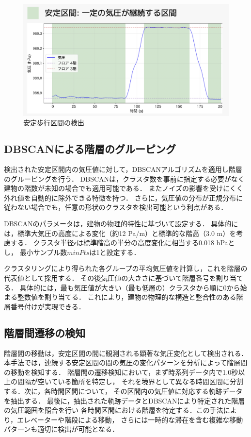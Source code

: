 \begin{figure}[h]
	\centering
	\includegraphics[width=\linewidth]{image/stable.jpg}
	\caption{安定歩行区間の検出}    \label{fig:stable_section}
\end{figure}

\subsection{DBSCANによる階層のグルーピング}
検出された安定区間内の気圧値に対して，DBSCANアルゴリズムを適用し階層のグルーピングを行う．
DBSCANは，クラスタ数を事前に指定する必要がなく建物の階数が未知の場合でも適用可能である．
またノイズの影響を受けにくく外れ値を自動的に除外できる特徴を持つ．
さらに，気圧値の分布が正規分布に従わない場合でも，任意の形状のクラスタを検出可能という利点がある．

DBSCANのパラメータは，建物の物理的特性に基づいて設定する．
具体的には，標準大気圧の高度による変化（約12 Pa/m）と標準的な階高（3.0 m）を考慮する．
クラスタ半径$\epsilon$は標準階高の半分の高度変化に相当する0.018 hPaとし，
最小サンプル数$minPts$は1と設定する．

クラスタリングにより得られた各グループの平均気圧値を計算し，これを階層の代表値として採用する．
その後気圧値の大きさに基づいて階層番号を割り当てる．
具体的には，最も気圧値が大きい（最も低層の）クラスタから順に0から始まる整数値を割り当てる．
これにより，建物の物理的な構造と整合性のある階層番号付けが実現できる．

\subsection{階層間遷移の検知}
階層間の移動は，安定区間の間に観測される顕著な気圧変化として検出される．
本手法では，連続する安定区間の間の気圧の変化パターンを分析によって階層間の移動を検知する．
階層間の遷移検知において，まず時系列データ内で1.0秒以上の間隔が空いている箇所を特定し，
それを境界として異なる時間区間に分割する．次に，各時間区間について，
その区間内の気圧値に対応する軌跡データを抽出する．
最後に，抽出された軌跡データとDBSCANにより特定された階層の気圧範囲を照合を行い
各時間区間における階層を特定する．この手法により，エレベーターや階段による移動，
さらには一時的な滞在を含む複雑な移動パターンも適切に検出が可能となる．

